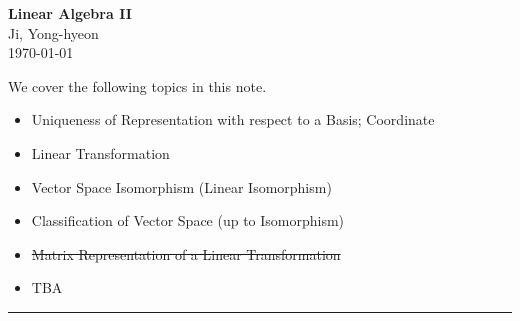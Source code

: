 \documentclass[11pt,openany]{article}
\renewcommand{\vec}[1]{\mathbf{#1}}
\begin{document}
\begin{center}
	\huge\textbf{Linear Algebra II}\\
	\vspace{0.5em}
	\large{Ji, Yong-hyeon}\\
	\vspace{0.5em}
	\normalsize{\today}\\
\end{center}

\noindent 
We cover the following topics in this note.
\begin{itemize}
	\item Uniqueness of Representation with respect to a Basis; Coordinate
	\item Linear Transformation
	\item Vector Space Isomorphism (Linear Isomorphism)
	\item Classification of Vector Space (up to Isomorphism)
	\item \st{Matrix Representation of a Linear Transformation}
	\item TBA
\end{itemize}
\hrule\vspace{12pt}
%	
%	
%	
%	
%	
%	
%	
%	
\end{document}
